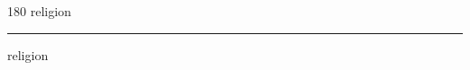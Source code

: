 
\begin{frame}
\begin{center}
\begin{turn}{180}
{\fontsize{2.5cm}{1em}\selectfont religion}
\end{turn}
\vspace{1em}\par  
\hrule
\vspace{1em}\par  
{\fontsize{2.5cm}{1em}\selectfont religion}
\end{center}
\end{frame}
